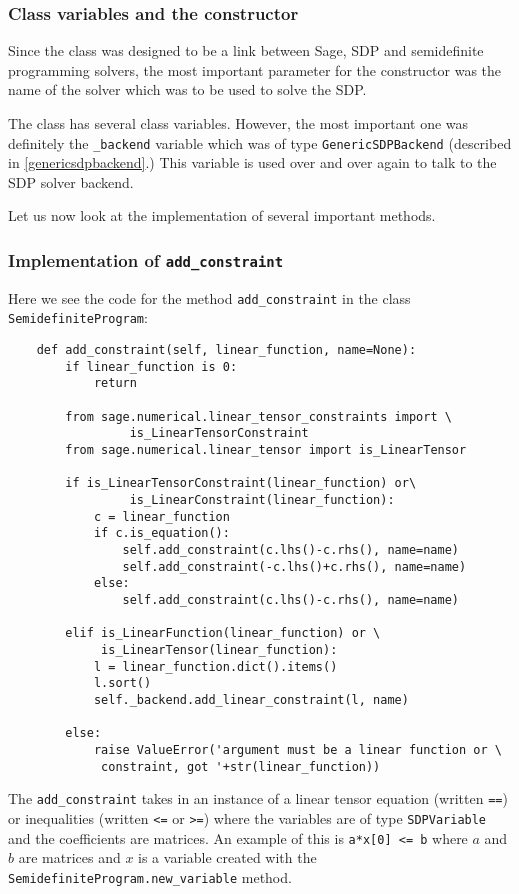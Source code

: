 	\subsubsection{Class variables and the constructor}
	Since the class was designed to be a link between Sage, SDP and semidefinite programming solvers, the most important parameter for the constructor was the name of the solver which was to be used to solve the SDP. 
	
	The class has several class variables. However, the most important one was definitely the \texttt{\_backend} variable which was of type \texttt{GenericSDPBackend} (described in \ref{genericsdpbackend}.) This variable is used over and over again to talk to the SDP solver backend. 

Let us now look at the implementation of several important methods.


	\subsubsection{Implementation of \texttt{add\_constraint}}
Here we see the code for the method \texttt{add\_constraint} in the class \texttt{SemidefiniteProgram}:
\begin{verbatim}
    def add_constraint(self, linear_function, name=None):
        if linear_function is 0:        
            return

        from sage.numerical.linear_tensor_constraints import \
        		 is_LinearTensorConstraint
        from sage.numerical.linear_tensor import is_LinearTensor

        if is_LinearTensorConstraint(linear_function) or\
        		 is_LinearConstraint(linear_function):
            c = linear_function
            if c.is_equation():
                self.add_constraint(c.lhs()-c.rhs(), name=name)
                self.add_constraint(-c.lhs()+c.rhs(), name=name)
            else:
                self.add_constraint(c.lhs()-c.rhs(), name=name)

        elif is_LinearFunction(linear_function) or \
        	 is_LinearTensor(linear_function):
            l = linear_function.dict().items()
            l.sort()
            self._backend.add_linear_constraint(l, name)

        else:
            raise ValueError('argument must be a linear function or \
             constraint, got '+str(linear_function))
\end{verbatim}
	
	The \texttt{add\_constraint} takes in an instance of a linear tensor equation (written \texttt{==}) or inequalities (written \texttt{<=} or \texttt{>=}) where the variables are of type \texttt{SDPVariable} and the coefficients are matrices. An example of this is \texttt{a*x[0] <= b} where $a$ and $b$ are matrices and $x$ is a variable created with the \texttt{SemidefiniteProgram.new\_variable} method. 
	
